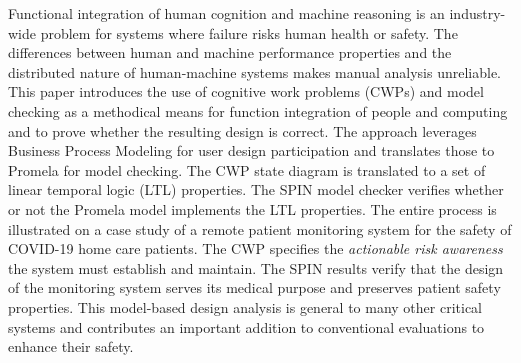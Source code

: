 Functional integration of human cognition and machine reasoning is an industry-wide problem for systems where failure risks human health or safety. The differences between human and machine performance properties and the distributed nature of human-machine systems makes manual analysis unreliable. This paper introduces the use of cognitive work problems (CWPs) and model checking as a methodical means for function integration of people and computing and to prove whether the resulting design is correct. The approach leverages Business Process Modeling for user design participation and translates those to Promela for model checking. The CWP state diagram is translated to a set of linear temporal logic (LTL) properties. The SPIN model checker verifies whether or not the Promela model implements the LTL properties. The entire process is illustrated on a case study of a remote patient monitoring system for the safety of COVID-19 home care patients. The CWP specifies the \emph{actionable risk awareness} the system must establish and maintain. The SPIN results verify that the design of the monitoring system serves its medical purpose and preserves patient safety properties. This model-based design analysis is general to many other critical systems and contributes an important addition to conventional evaluations to enhance their safety.